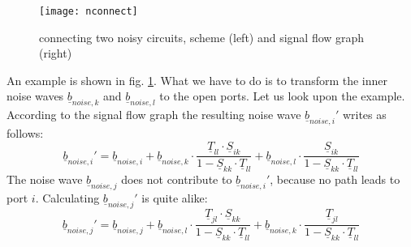 \documentclass[10pt]{report}
\begin{document}
\begin{figure}[ht]
\begin{center}
\texttt{[image: nconnect]}
\end{center}
\caption{connecting two noisy circuits, scheme (left) and signal flow graph (right)}
\label{fig:nconnect}
\end{figure}
\FloatBarrier

An example is shown in fig. \ref{fig:nconnect}.  What we have to do is
to transform the inner noise waves $\underline{b}_{noise,k}$ and
$\underline{b}_{noise,l}$ to the open ports.  Let us look upon the
example.  According to the signal flow graph the resulting noise wave
$\underline{b}_{noise,i}'$ writes as follows:
\begin{equation}
\underline{b}_{noise,i}' = \underline{b}_{noise,i} +
    \underline{b}_{noise,k}\cdot
            \frac{\underline{T}_{ll}\cdot \underline{S}_{ik}}{1-\underline{S}_{kk}\cdot\underline{T}_{ll}} +
    \underline{b}_{noise,l}\cdot
            \frac{\underline{S}_{ik}}{1-\underline{S}_{kk}\cdot\underline{T}_{ll}}
\label{eq:bnoiseI}
\end{equation}
The noise wave $\underline{b}_{noise,j}$ does not contribute to
$\underline{b}_{noise,i}'$, because no path leads to port $i$.
Calculating $\underline{b}_{noise,j}'$ is quite alike:
\begin{equation}
\underline{b}_{noise,j}' = \underline{b}_{noise,j} +
    \underline{b}_{noise,l}\cdot
            \frac{\underline{T}_{jl}\cdot \underline{S}_{kk}}{1-\underline{S}_{kk}\cdot\underline{T}_{ll}} +
    \underline{b}_{noise,k}\cdot
            \frac{\underline{T}_{jl}}{1-\underline{S}_{kk}\cdot\underline{T}_{ll}}
\label{eq:bnoiseJ}
\end{equation}
\end{document}
